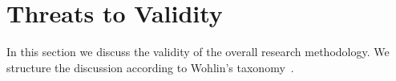 \documentclass[10pt,journal,letterpaper,compsoc]{IEEEtran}
\begin{document}
\section{Threats to Validity} \label{valt} 

In this section we discuss the validity of the overall research methodology. 
We structure the discussion according to Wohlin's taxonomy~\cite{Wohlin2000}.


\end{document}
